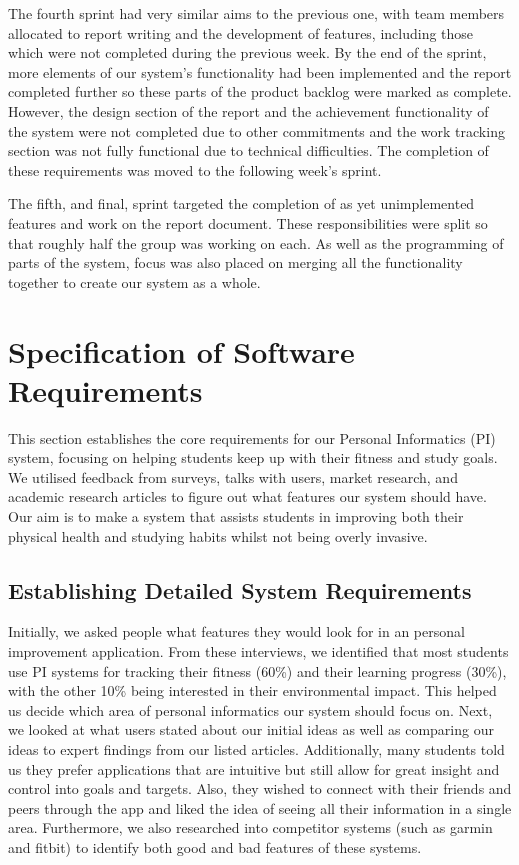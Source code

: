 \documentclass[12pt]{article}
\begin{document}
The fourth sprint had very similar aims to the previous one, with team members allocated to report writing and the development of features, including those which were not completed during the previous week. By the end of the sprint, more elements of our system's functionality had been implemented and the report completed further so these parts of the product backlog were marked as complete. However, the design section of the report and the achievement functionality of the system were not completed due to other commitments and the work tracking section was not fully functional due to technical difficulties. The completion of these requirements was moved to the following week's sprint.\par

The fifth, and final, sprint targeted the completion of as yet unimplemented features and work on the report document. These responsibilities were split so that roughly half the group was working on each. As well as the programming of parts of the system, focus was also placed on merging all the functionality together to create our system as a whole.
\newpage
\section{Specification of Software Requirements}

This section establishes the core requirements for our Personal Informatics
(PI) system, focusing on helping students keep up with their fitness and study
goals. We utilised feedback from surveys, talks with users, market research,
and academic research articles to figure out what features our system should have. Our
aim is to make a system that assists students in improving both their physical
health and studying habits whilst not being overly invasive.


\subsection{Establishing Detailed System Requirements}

Initially, we asked people what features they would look for in an personal
improvement application. From these interviews, we identified that most students use PI systems for
tracking their fitness (60\%) and their learning progress (30\%), with the other 10\% being interested in their environmental impact. This
helped us decide which area of personal informatics our system should focus on. Next, we looked
at what users stated about our initial ideas as well as comparing our ideas
to expert findings from our listed articles. Additionally, many students told us they prefer applications
that are intuitive but still allow for great insight and control into goals
and targets. Also, they wished to connect with their friends and peers through the app and
liked the idea of seeing all their information in a single area. Furthermore, we also researched into competitor 
systems (such as garmin and fitbit) to identify both good and bad features of these systems.\par
\end{document}

